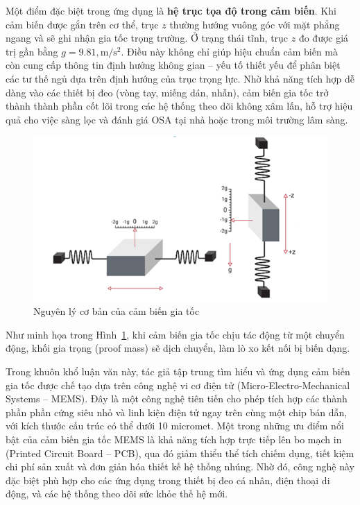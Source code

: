 Một điểm đặc biệt trong ứng dụng là \textbf{hệ trục tọa độ trong cảm biến}. 
Khi cảm biến được gắn trên cơ thể, trục $z$ thường hướng vuông góc 
với mặt phẳng ngang và sẽ ghi nhận gia tốc trọng trường. 
Ở trạng thái tĩnh, trục $z$ đo được giá trị gần bằng $g = 9.81, 
\mathrm{m/s^2}$. Điều này không chỉ giúp hiệu chuẩn cảm biến mà 
còn cung cấp thông tin định hướng không gian – yếu tố thiết yếu 
để phân biệt các tư thế ngủ dựa trên định hướng của trục trọng lực.
Nhờ khả năng tích hợp dễ dàng vào các thiết bị đeo (vòng tay, miếng dán, nhẫn), cảm biến gia tốc trở thành thành phần cốt lõi trong các hệ thống theo dõi không xâm lấn, hỗ trợ hiệu quả cho việc sàng lọc và đánh giá OSA tại nhà hoặc trong môi trường lâm sàng.
\begin{figure}[!ht]
		\centering
 		\includegraphics[width=\textwidth]{images/acce.png}
 		\vspace*{-7mm}
		\caption{Nguyên lý cơ bản của cảm biến gia tốc}
		\label{acce}
\end{figure}

Như minh họa trong Hình~\ref{acce}, khi cảm biến gia tốc chịu tác động từ 
một chuyển động, khối gia trọng (proof mass) sẽ dịch chuyển, 
làm lò xo kết nối bị biến dạng. 




Trong khuôn khổ luận văn này, tác giả tập trung tìm hiểu và ứng dụng 
cảm biến gia tốc được chế tạo dựa trên công nghệ vi cơ điện tử (Micro-Electro-Mechanical Systems – MEMS). 
Đây là một công nghệ tiên tiến cho phép tích hợp các thành phần phần cứng siêu nhỏ và 
linh kiện điện tử ngay trên cùng một chip bán dẫn, với kích thước cấu trúc có thể dưới 
10 micromet. Một trong những ưu điểm nổi bật của cảm biến gia tốc MEMS là 
khả năng tích hợp trực tiếp lên bo mạch in (Printed Circuit Board – PCB), 
qua đó giảm thiểu thể tích chiếm dụng, tiết kiệm chi phí sản xuất và 
đơn giản hóa thiết kế hệ thống nhúng. Nhờ đó, công nghệ này đặc biệt phù hợp 
cho các ứng dụng trong thiết bị đeo cá nhân, điện thoại di động, và các 
hệ thống theo dõi sức khỏe thế hệ mới.

